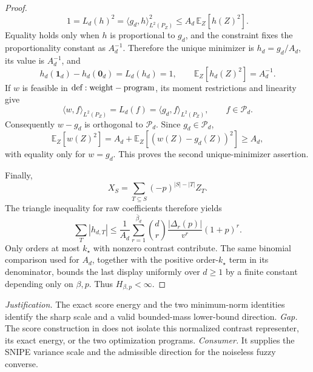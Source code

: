 \documentclass{article}
\begin{document}
\begin{proof}
\[
1=L_d(h)^2=\langle g_d,h\rangle_{L^2(P_Z)}^2\le A_d\,\mathbb E_Z[h(Z)^2].
\]
Equality holds only when \(h\) is proportional to \(g_d\), and the constraint fixes the proportionality constant as \(A_d^{-1}\). Therefore the unique minimizer is \(h_d=g_d/A_d\), its value is \(A_d^{-1}\), and
\[
h_d(\mathbf1_d)-h_d(\mathbf0_d)=L_d(h_d)=1,
\qquad
\mathbb E_Z[h_d(Z)^2]=A_d^{-1}.
\]
If \(w\) is feasible in \({\rm def:weight-program}\), its moment restrictions and linearity give
\[
\langle w,f\rangle_{L^2(P_Z)}=L_d(f)=\langle g_d,f\rangle_{L^2(P_Z)},\qquad f\in\mathcal P_d.
\]
Consequently \(w-g_d\) is orthogonal to \(\mathcal P_d\). Since \(g_d\in\mathcal P_d\),
\[
\mathbb E_Z[w(Z)^2]=A_d+\mathbb E_Z[(w(Z)-g_d(Z))^2]\ge A_d,
\]
with equality only for \(w=g_d\). This proves the second unique-minimizer assertion.

Finally,
\[
X_S=\sum_{T\subseteq S}(-p)^{|S|-|T|}Z_T.
\]
The triangle inequality for raw coefficients therefore yields
\[
\sum_T|h_{d,T}|
\le \frac{1}{A_d}\sum_{r=1}^{\bar\beta_d}\binom dr\frac{|\Delta_r(p)|}{v^r}(1+p)^r.
\]
Only orders at most \(k_\star\) with nonzero contrast contribute. The same binomial comparison used for \(A_d\), together with the positive order-\(k_\star\) term in its denominator, bounds the last display uniformly over \(d\ge1\) by a finite constant depending only on \(\beta,p\). Thus \(H_{\beta,p}<\infty\).
\end{proof}
\par\smallskip\noindent \textit{Justification.} The exact score energy and the two minimum-norm identities identify the sharp scale and a valid bounded-mass lower-bound direction. \textit{Gap.} The score construction in \cite{CortezRodriguezEichhornYu2023} does not isolate this normalized contrast representer, its exact energy, or the two optimization programs. \textit{Consumer.} It supplies the SNIPE variance scale and the admissible direction for the noiseless fuzzy converse.
\end{document}
